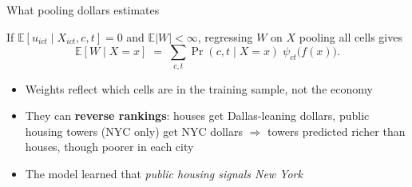 \documentclass[10pt,aspectratio=169]{beamer}
\newcommand{\E}{\mathbb{E}}
\begin{document}
\begin{frame}{What pooling dollars estimates}
\begin{resultbox}
If $\E[u_{ict}\mid X_{ict},c,t]=0$ and $\E|W|<\infty$, regressing $W$ on $X$ pooling all cells gives
\[
  \E[W\mid X=x] \;=\; \sum_{c,t}\Pr(c,t\mid X=x)\;\psi_{ct}\big(f(x)\big).
\]
\end{resultbox}
\begin{itemize}
  \item Weights reflect which cells are in the training sample, not the economy
  \item They can \textbf{reverse rankings}: houses get Dallas-leaning dollars, public housing towers (NYC only) get NYC dollars $\Rightarrow$ towers predicted richer than houses, though poorer in each city
  \item The model learned that \emph{public housing signals New York}
\end{itemize}
\end{frame}
\end{document}
